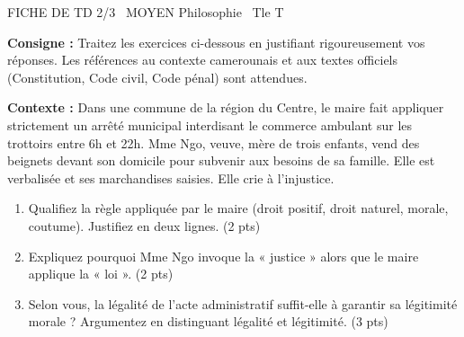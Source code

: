 \documentclass[11pt]{article}
\begin{document}
\begin{tcolorbox}[enhanced,colback=popink,colframe=popink,arc=10pt,boxrule=0pt,left=12pt,right=12pt,top=9pt,bottom=9pt]
{\color{white}\popxbold\small FICHE DE TD 2/3 \textbullet\ MOYEN \hfill Philosophie \textbullet\ Tle T\par}
\end{tcolorbox}
\vspace{4pt}
\noindent\textbf{Consigne :} Traitez les exercices ci-dessous en justifiant rigoureusement vos réponses. Les références au contexte camerounais et aux textes officiels (Constitution, Code civil, Code pénal) sont attendues.

\begin{exercice}
\textbf{Contexte :} Dans une commune de la région du Centre, le maire fait appliquer strictement un arrêté municipal interdisant le commerce ambulant sur les trottoirs entre 6h et 22h. Mme Ngo, veuve, mère de trois enfants, vend des beignets devant son domicile pour subvenir aux besoins de sa famille. Elle est verbalisée et ses marchandises saisies. Elle crie à l'injustice.
\begin{enumerate}
    \item Qualifiez la règle appliquée par le maire (droit positif, droit naturel, morale, coutume). Justifiez en deux lignes. (2 pts)
    \item Expliquez pourquoi Mme Ngo invoque la « justice » alors que le maire applique la « loi ». (2 pts)
    \item Selon vous, la légalité de l'acte administratif suffit-elle à garantir sa légitimité morale ? Argumentez en distinguant \og légalité\fg{} et \og légitimité\fg{}. (3 pts)
\end{enumerate}
\end{exercice}
\end{document}
